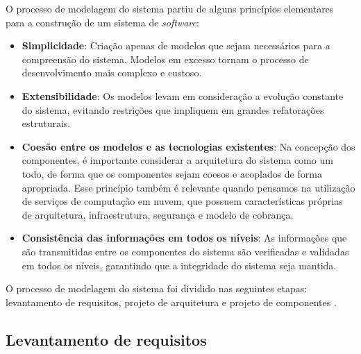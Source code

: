 O processo de modelagem do sistema partiu de alguns princípios elementares para a construção de um sistema de \textit{software}: 

\begin{itemize}
    \item \textbf{Simplicidade}: Criação apenas de modelos que sejam necessários para a compreensão do sistema. Modelos em excesso tornam o processo de desenvolvimento mais complexo e custoso.

    \item \textbf{Extensibilidade}: Os modelos levam em consideração a evolução constante do sistema, evitando restrições que impliquem em grandes refatorações estruturais. 


    \item \textbf{Coesão entre os modelos e as tecnologias existentes}: Na concepção dos componentes, é importante considerar a arquitetura do sistema como um todo, de forma que os componentes sejam coesos e acoplados de forma apropriada. Esse princípio também é relevante quando pensamos na utilização de serviços de computação em nuvem, que possuem características próprias de arquitetura, infraestrutura, segurança e modelo de cobrança.


    \item \textbf{Consistência das informações em todos os níveis}: As informações que são transmitidas entre os componentes do sistema são verificadas e validadas em todos os níveis, garantindo que a integridade do sistema seja mantida.

\end{itemize}

O processo de modelagem do sistema foi dividido nas seguintes etapas: levantamento de requisitos, projeto de arquitetura e projeto de componentes \citep{pressman2016}.

\subsection{Levantamento de requisitos}
\label{subsec:levantamentoDeRequisitos}

